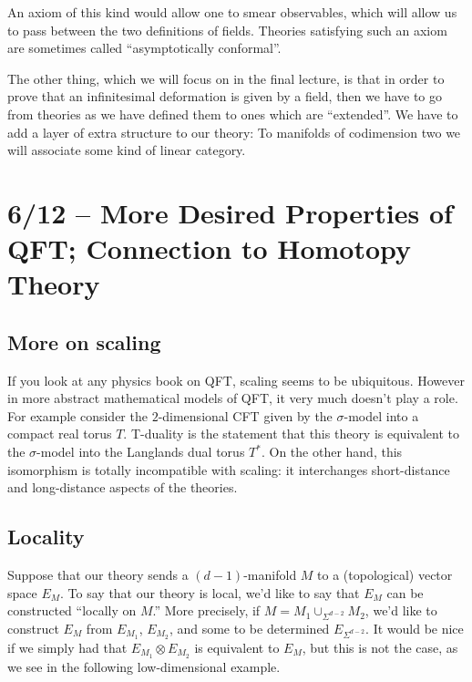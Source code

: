 An axiom of this kind would allow one to smear observables, which will allow us to pass
between the two definitions of fields.
Theories satisfying such an axiom are sometimes called 
``asymptotically conformal''.

The other thing, which we will focus on in the final lecture, 
is that in order to prove that an infinitesimal deformation is given by a field, then we
have to go from theories as we have defined them to ones which are ``extended''.
We have to add a layer of extra structure to our theory: To manifolds of codimension two
we will associate some kind of linear category. 

\section{6/12 -- More Desired Properties of QFT; Connection to Homotopy Theory}

\subsection{More on scaling}
\label{sec:scaling_2}

If you look at any physics book on QFT, scaling seems to be ubiquitous.
However in more abstract mathematical models of QFT, it very much doesn't play a role. 
For example consider the $2$-dimensional CFT given by the $\sigma$-model into a compact
real torus $T$. T-duality is the statement that this theory is equivalent to the 
$\sigma$-model into the Langlands dual torus $T^*$.
On the other hand, this isomorphism is totally incompatible with scaling: 
it interchanges short-distance and long-distance aspects of the theories.

\subsection{Locality}

Suppose that our theory sends a $(d-1)$-manifold $M$ to a (topological) vector space $E_M$.
To say that our theory is local, we'd like to say that $E_M$ can be constructed ``locally on $M$.''
More precisely, if $M = M_1 \cup_{\Sigma^{d-2}} M_2$, we'd like to construct $E_M$ from
$E_{M_1}$, $E_{M_2}$, and some to be determined $E_{\Sigma^{d-2}}$.
It would be nice if we simply had that $E_{M_1} \otimes E_{M_2}$ is equivalent to  $E_M$,
but this is not the case, as we see in the following low-dimensional example.

